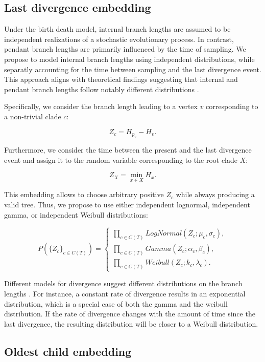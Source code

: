 \documentclass[10pt,letterpaper]{article}
\begin{document}

\subsection*{Last divergence embedding}

Under the birth death model, internal branch lengths are assumed to be independent realizations of a stochastic evolutionary process. In contrast, pendant branch lengths are primarily influenced by the time of sampling. We propose to model internal branch lengths using independent distributions, while separatly accounting for the time between sampling and the last divergence event. This approach aligns with theoretical findings suggesting that internal and pendant branch lengths follow notably different distributions \cite{birthdeathdistribution,birthdeathdistributionstadler}.

Specifically, we consider the branch length leading to a vertex $v$ corresponding to a non-trivial clade $c$:

$$
Z_c = H_{p_v} - H_v.
$$

Furthermore, we consider the time between the present and the last divergence event and assign it to the random variable corresponding to the root clade $X$:

$$
Z_X = \min_{x \in X}{H_x}.
$$

This embedding allows to choose arbitrary positive $Z_c$ while always producing a valid tree. Thus, we propose to use either independent lognormal, independent gamma, or independent Weibull distributions:

$$
P(\{Z_c\}_{c \in C(T)}) = \begin{cases}
	\prod_{c \in C(T)}{LogNormal(Z_c; \mu_c, \sigma_c)}, \\
	\prod_{c \in C(T)}{Gamma(Z_c; \alpha_c, \beta_c)}, \\
	\prod_{c \in C(T)}{Weibull(Z_c; k_c, \lambda_c)}.
\end{cases}
$$

Different models for divergence suggest different distributions on the branch lengths \cite{venditti2010phylogenies}. For instance, a constant rate of divergence results in an exponential distribution, which is a special case of both the gamma and the weibull distribution. If the rate of divergence changes with the amount of time since the last divergence, the resulting distribution will be closer to a Weibull distribution.

\subsection*{Oldest child embedding}
\end{document}
